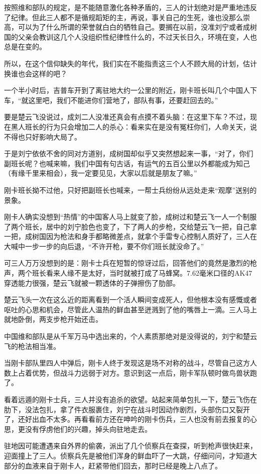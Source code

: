 按照维和部队的规定，是不能随意激化各种矛盾的，三人的计划绝对是严重地违反了纪律。但此三人都不是循规蹈矩的主，再说，事关自己的生死，谁也没那么崇高，可以为了什么所谓的荣誉就白白的牺牲自己。要搁在以前，没准刘宁或者成树国的父亲会教训这几个人没组织性纪律性什么的，不过天长日久，环境在变，人也总是在变的。

所以，在这个信仰缺失的年代，我们实在不能指责这三个人不顾大局的计划，估计换谁也会这样的吧？

一个半小时后，吉普车开到了离驻地大约一公里的附近，刚卡班长叫几个中国人下车，“就这里吧，我们不能进你们营地了，部队有事，还要赶回去的。”

要是楚云飞没说过，成刘二人没准还真会有点摸不着头脑：在这里下车？不过，现在黑人班长的行为只会增加二人的杀心：看来实在是没有冤枉你们，人命关天，说不得也只好影响大局了。

于是刘宁依依不舍的同对方道别，成树国却似乎又突然想起来一事，“对了，你们副班长呢？也喊来嘛，我们中国有句古话，有运气的五百公里以外都能成为知己（有缘千里来相会），我一定要见见，大家以后就是朋友了嘛。”

刚卡班长拗不过他，只好把副班长也喊来，一帮士兵纷纷从远处走来“观摩”送别的景象。

刚卡人确实没想到“热情”的中国客人马上就变了脸，成树过和楚云飞一人一个制服了两个班长，居中的刘宁脸色也变了，下了两人的步枪，交给楚云飞一把，自己拿一把，成树国因为枪法和身手都略微差点，就拿个手雷专心控制人质好了，三人在大喊中一步一步的向后退，“不许开枪，要不你们班长就没命了。”

可三人万万没想到的是：刚卡士兵在短暂的惊讶过后，回答他们的竟然是激烈的枪声，两个班长看来人缘不是太好，当时就被打成了马蜂窝。7.62毫米口径的AK47穿透能力很强，楚云飞就被一颗透体的子弹擦伤了肋部。

楚云飞头一次在这么近的距离看到一个活人瞬间变成死人，但他根本没有感慨或者呕吐的心思和机会，尽管此人温热的鲜血甚至迸溅到了他的嘴唇上一滴。三人马上就地卧倒，两支步枪开始还击。

中国维和部队是从千军万马中选出来的，个人素质那绝对是没得说的，刘宁和楚云飞的枪法相当准。

当刚卡部队里四人中弹后，刚卡人终于发现这是场不对称的战斗，尽管自己这方人数上占着优势，但战斗力远弱于对方。意识到这一点后，刚卡军队顿时做鸟兽状跑了。

看着远遁的刚卡士兵，三人并没有追杀的欲望。站起来简单包扎一下，楚云飞伤在肋下，没法包扎，拿了件衣服裹住，刘宁在战斗时因动作剧烈，头部伤口又裂开了，还好出血不太多。再看看前方还在呻吟的刚卡伤兵，三人也没有前去报复的心思，更没有俘虏他们的兴趣，掉头向驻地走去。

驻地因可能遭遇来自外界的偷袭，派出了几个侦察兵在查探，听到枪声很快赶来，迎面撞上了三人。侦察兵先是被他们浑身的鲜血吓了一大跳，仔细问问，才知道大部分的血液来自于刚卡人，赶紧带他们回去，那时已经是晚上八点了。

